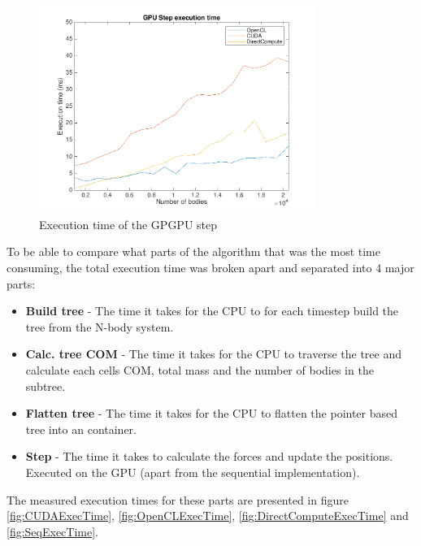 \begin{figure}[H]
    \centering
    \includegraphics[width=0.8\textwidth]{Results/Figs/GPUStepExecutionTime.png}
    \caption{Execution time of the GPGPU step}
    \label{fig:GPUStepExecTime}
\end{figure}

To be able to compare what parts of the algorithm that was the most time consuming, the total execution time was broken apart and separated into 4 major parts:
\begin{itemize}
    \item \textbf{Build tree} - The time it takes for the CPU to for each timestep build the tree from the N-body system.
    \item \textbf{Calc. tree COM} - The time it takes for the CPU to traverse the tree and calculate each cells COM, total mass and the number of bodies in the subtree.
    \item \textbf{Flatten tree} - The time it takes for the CPU to flatten the pointer based tree into an container.
    \item \textbf{Step} - The time it takes to calculate the forces and update the positions. Executed on the GPU (apart from the sequential implementation).
\end{itemize}

The measured execution times for these parts are presented in figure \ref{fig:CUDAExecTime}, \ref{fig:OpenCLExecTime}, \ref{fig:DirectComputeExecTime} and \ref{fig:SeqExecTime}.

